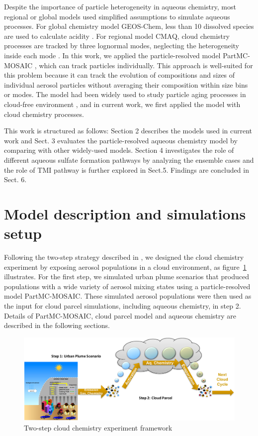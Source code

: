 \documentclass[edeposit,fullpage]{uiucthesis2009}
\begin{document}
Despite the importance of particle heterogeneity in aqueous chemistry, most regional or global models used simplified assumptions to simulate aqueous processes. For global chemistry model GEOS-Chem, less than 10 dissolved species are used to calculate acidity \citep{alexander2012isotopic}.
For regional model CMAQ, cloud chemistry processes are tracked by three lognormal modes, neglecting the heterogeneity inside each mode \citep{fahey2017framework}. In this work, we applied the particle-resolved model PartMC-MOSAIC \citep{Riemer2009, Zaveri2010a}, which can track particles individually. This approach is well-suited for this problem because it can track the evolution of compositions and sizes of individual aerosol particles without averaging their composition within size bins or modes. The model had been widely used to study particle aging processes in cloud-free environment \citet{ching2012impacts, Ching2016}, and in current work, we first applied the model with cloud chemistry processes. 

This work is structured as follows: Section 2 describes the models used in current work and Sect. 3 evaluates the particle-resolved aqueous chemistry model by comparing with other widely-used models. Section 4 investigates the role of different aqueous sulfate formation pathways by analyzing the ensemble cases and the role of TMI pathway is further explored in Sect.5. Findings are concluded in Sect. 6. 

\section{Model description and simulations setup}
Following the two-step strategy described in \citet{ching2012impacts}, we designed the cloud chemistry experiment by exposing aerosol populations in a cloud environment, as figure~\ref{chap2-fig1-frame} illustrates. For the first step, we simulated urban plume scenarios that produced populations with a wide variety of aerosol mixing states using a particle-resolved model PartMC-MOSAIC. These simulated aerosol populations were then used as the input for cloud parcel simulations, including aqueous chemistry, in step 2. Details of PartMC-MOSAIC, cloud parcel model and aqueous chemistry are described in the following sections.

\begin{figure}[ht]
    \centering 
    \includegraphics[scale=0.4]{chap2_figs/chap2-fig1-frame.pdf}
    \caption{Two-step cloud chemistry experiment framework}
    \label{chap2-fig1-frame}
\end{figure}
\end{document}
